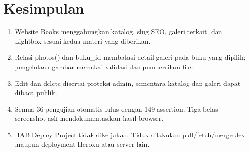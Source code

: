 \documentclass[a4paper,oneside,12pt]{book}
\begin{document}
\chapter{Kesimpulan}
\begin{enumerate}
\item Website Books menggabungkan katalog, slug SEO, galeri terkait, dan Lightbox sesuai kedua materi yang diberikan.
\item Relasi photos() dan buku\_id membatasi detail galeri pada buku yang dipilih; pengelolaan gambar memakai validasi dan pembersihan file.
\item Edit dan delete disertai proteksi admin, sementara katalog dan galeri dapat dibaca publik.
\item Semua 36 pengujian otomatis lulus dengan 149 assertion. Tiga belas screenshot asli mendokumentasikan hasil browser.
\item BAB Deploy Project tidak dikerjakan. Tidak dilakukan pull/fetch/merge dev maupun deployment Heroku atau server lain.
\end{enumerate}
\printbibliography[heading=bibintoc,title={Daftar Pustaka}]
\end{document}
